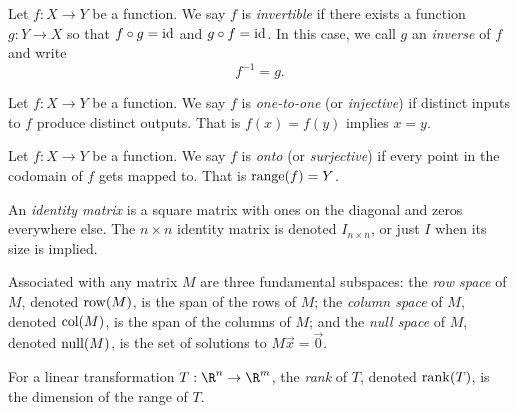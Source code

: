 \begin{SaveDefinition}[
	key=InverseFunction,
	title={Inverse Function}]
		
	Let $f:X\to Y$ be a function. We say $f$ is \emph{invertible} if
	there exists a function $g:Y\to X$ so that $f\circ g=\operatorname{\operatorname{id}}$ and $g\circ f=\operatorname{\operatorname{id}}$.
	In this case, we call $g$ an \emph{inverse} of $f$ and write
	\[
		f^{-1}=g.
	\]
\end{SaveDefinition}

\begin{SaveDefinition}[
	key=Onetoone,
	title={One-to-one}]
		
	Let $f:X\to Y$ be a function. We say $f$ is \emph{one-to-one} (or \emph{injective}) if
	distinct inputs to $f$ produce distinct outputs. That is $f(x)=f(y)$ implies $x=y$.
\end{SaveDefinition}

\begin{SaveDefinition}[
	key=Onto,
	title={Onto}]
		
	Let $f:X\to Y$ be a function.
	We say $f$ is \emph{onto} (or \emph{surjective}) if every point in the codomain of $f$ gets mapped to.
	That is $\operatorname{range}(f)=Y$.
\end{SaveDefinition}

\begin{SaveDefinition}[
	key=IdentityMatrix,
	title={Identity Matrix}]
	
	An \emph{identity matrix} is a square matrix with ones on the diagonal
	and zeros everywhere else. The $n\times n$ identity matrix is denoted $I_{n\times n}$,
	or just $I$ when its size is implied.
\end{SaveDefinition}

\begin{SaveDefinition}[key=FundamentalSubspaces, title={Fundamental Subspaces}]
	Associated with any matrix $M$ are three fundamental subspaces: the
	\emph{row space} of $M$, denoted $\operatorname{row}(M)$, is the span of the rows of
	$M$; the
	\emph{column space} of $M$, denoted $\operatorname{col}(M)$, is the span of the
	columns of $M$; and the
	\emph{null space} of $M$, denoted $\operatorname{null}(M)$, is the set of solutions to
	$M\vec x=\vec 0$.
\end{SaveDefinition}

\begin{SaveDefinition}[key=RankofaLinearTransformation, title={Rank of a Linear Transformation}]
	For a linear transformation $T:\R^n\to \R^m$, the
	\emph{rank} of $T$, denoted $\operatorname{rank}(T)$, is the dimension of the range of
	$T$.
\end{SaveDefinition}


